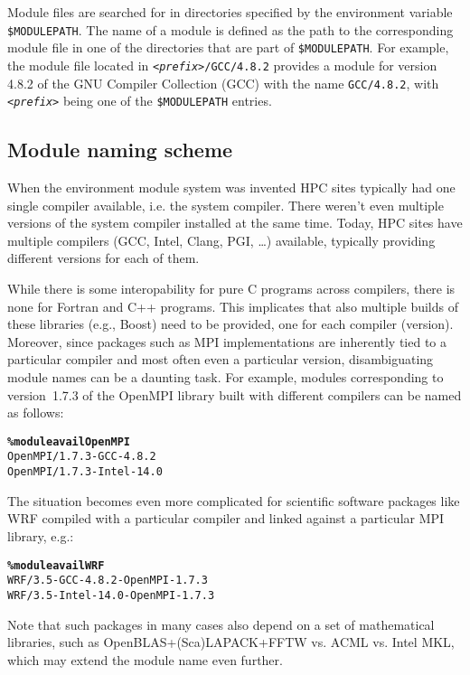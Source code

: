 Module files are searched for in directories specified by the
environment variable \texttt{\small \$MODULEPATH}. The name of a module is defined
as the path to the corresponding module file in one of the directories that are
part of \texttt{\small \$MODULEPATH}. For example, the module file located in
\texttt{\small \emph{<prefix>}/GCC/4.8.2}
provides a module for version 4.8.2 of the GNU Compiler Collection (GCC) with the
name \texttt{\small GCC/4.8.2}, with \texttt{\small\emph{<prefix>}} being one of the
\texttt{\small \$MODULEPATH} entries.

\subsection{Module naming scheme}
\label{sec:Module_naming_scheme}
When the environment module system was invented HPC sites typically had
one single compiler available, i.e. the system compiler.
There weren't even multiple versions of the system compiler installed
at the same time.  Today, HPC sites have multiple compilers (GCC, Intel,
Clang, PGI, \ldots) available, typically providing different versions for
each of them.

While there is some interopability for pure C programs across
compilers, there is none for Fortran and C++ programs.  This implicates that
also multiple builds of these libraries (e.g., Boost) need to be provided,
one for each compiler (version).
Moreover, since packages such as MPI implementations are inherently tied to a
particular compiler and most often even a particular version, disambiguating
module names can be a daunting task. For example, modules corresponding to
version~1.7.3 of the OpenMPI library built with different compilers can be named
as follows:
{\small
\begin{alltt}
    \textbf{\% module avail OpenMPI}
    OpenMPI/1.7.3-GCC-4.8.2
    OpenMPI/1.7.3-Intel-14.0
\end{alltt}
}

The situation becomes even more complicated for scientific software
packages like WRF compiled with a particular compiler and linked
against a particular MPI library, e.g.:
{\small
\begin{alltt}
    \textbf{\% module avail WRF}
    WRF/3.5-GCC-4.8.2-OpenMPI-1.7.3
    WRF/3.5-Intel-14.0-OpenMPI-1.7.3
\end{alltt}
}
\noindent
Note that such packages in many cases also depend on a set of mathematical
libraries, such as OpenBLAS+(Sca)LAPACK+FFTW vs. ACML vs. Intel MKL, which may
extend the module name even further.

